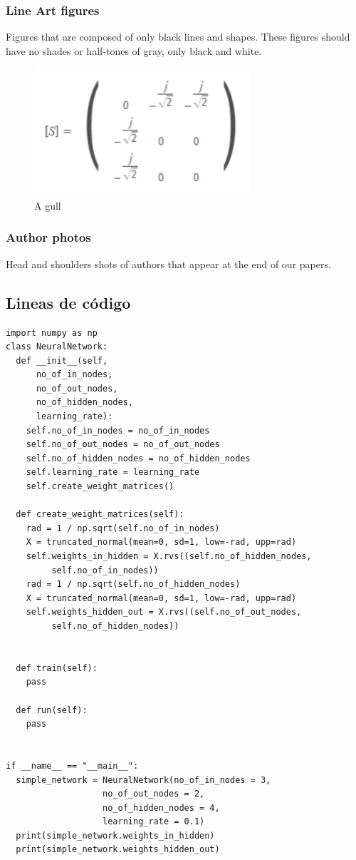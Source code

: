 \documentclass[a4paper]{IEEEtran} %
\begin{document}
\subsubsection{Line Art figures}
{Figures that are composed of only black lines and shapes. These figures 
should have no shades or half-tones of gray, only black and white.}

\begin{figure}
    \centering
        \includegraphics[width=8cm]{imagenes/img1}
        \caption{A gull}
        \label{fig:gull}
\end{figure}

\subsubsection{Author photos}
{Head and shoulders shots of authors that appear at the end of our papers. }

\subsection{Lineas de código}

\begin{lstlisting}[style=C]
import numpy as np
class NeuralNetwork:
  def __init__(self,
      no_of_in_nodes,
      no_of_out_nodes,
      no_of_hidden_nodes,
      learning_rate):
    self.no_of_in_nodes = no_of_in_nodes
    self.no_of_out_nodes = no_of_out_nodes
    self.no_of_hidden_nodes = no_of_hidden_nodes
    self.learning_rate = learning_rate
    self.create_weight_matrices()

  def create_weight_matrices(self):
    rad = 1 / np.sqrt(self.no_of_in_nodes)
    X = truncated_normal(mean=0, sd=1, low=-rad, upp=rad)
    self.weights_in_hidden = X.rvs((self.no_of_hidden_nodes,
         self.no_of_in_nodes))
    rad = 1 / np.sqrt(self.no_of_hidden_nodes)
    X = truncated_normal(mean=0, sd=1, low=-rad, upp=rad)
    self.weights_hidden_out = X.rvs((self.no_of_out_nodes,
         self.no_of_hidden_nodes))


  def train(self):
    pass

  def run(self):
    pass


if __name__ == "__main__":
  simple_network = NeuralNetwork(no_of_in_nodes = 3,
                   no_of_out_nodes = 2,
                   no_of_hidden_nodes = 4,
                   learning_rate = 0.1)
  print(simple_network.weights_in_hidden)
  print(simple_network.weights_hidden_out)
\end{lstlisting}
\end{document}
